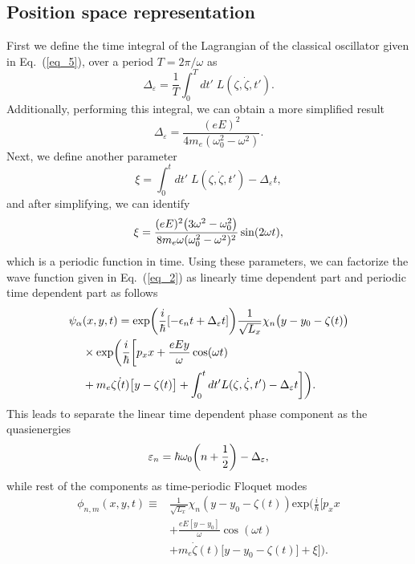 \subsection{Position space representation}

First we define the time integral of the Lagrangian of the classical oscillator given in Eq.~(\ref{eq_5}), over a period $T=2\pi/\omega$ as
\begin{equation} \label{eq_b1}
  \Delta_{\varepsilon} = \frac{1}{T} \int_0^T dt' \; L(\zeta,\dot{\zeta},t').
\end{equation}
Additionally, performing this integral, we can obtain a more simplified result
\begin{equation} \label{eq_b2}
  \Delta_{\varepsilon} = \frac{(eE)^2}{4m_e(\omega_0^2 - \omega^2)}.
\end{equation}
Next, we define another parameter
\begin{equation} \label{eq_b3}
  \xi =
  \int_0^t dt' \; L(\zeta,\dot{\zeta},t') -
  \Delta_{\varepsilon} t,
\end{equation}
and after simplifying, we can identify
\begin{equation} \label{eq_b4}
  \xi =
  \frac{(eE)^2\qty(3\omega^2 - \omega_0^2)}{8m_e\omega(\omega_0^2 - \omega^2)^2} \sin(2\omega t),
\end{equation}
which is a periodic function in time. Using these parameters, we can factorize the wave function given in Eq.~(\ref{eq_2}) as linearly time dependent part and periodic time dependent part as follows
\begin{equation} \label{eq_b5}
  \begin{aligned}
    \psi_{\alpha}&(x,y,t)  =
    \exp(\frac{i}{\hbar}\qty[-\epsilon_nt + \Delta_{\varepsilon} t ])
    \frac{1}{\sqrt{L_x}} \chi_n\big(y - y_0 - \zeta(t)\big)
    \\
    & \times
    \text{exp}\bigg(
     \frac{i}{\hbar}\bigg[
     p_x x +
     \frac{eEy}{\omega}\cos(\omega t) \\
     & +
     m_e\dot{\zeta(t)}\big[y-\zeta(t)\big]
     + \int_0^{t}dt'L(\zeta,\dot{\zeta},t') - \Delta_{\varepsilon} t  \bigg]
     \bigg).
  \end{aligned}
\end{equation}
This leads to separate the linear time dependent phase component as the quasienergies
\begin{equation} \label{eq_b6}
  \varepsilon_{n} =
  \hbar \omega_0\qty(n + \frac{1}{2}) - \Delta_{\varepsilon},
\end{equation}
while rest of the components as time-periodic Floquet modes
\begin{equation} \label{eq_b7}
  \begin{aligned}
    \phi_{n,m}(x,y,t) \equiv &
    \frac{1}{\sqrt{L_x}} \chi_{n}\left(y - y_0 - \zeta(t)\right)
    \text{exp}\bigg(
     \frac{i}{\hbar}\bigg[
     p_x x \\
     & +
     \frac{eE[y - y_0]}{\omega}\cos(\omega t) \\
     & +
     m_e\dot{\zeta}(t)\big[y - y_0 -\zeta(t)\big]
     + \xi \bigg]\bigg).
  \end{aligned}
\end{equation}

